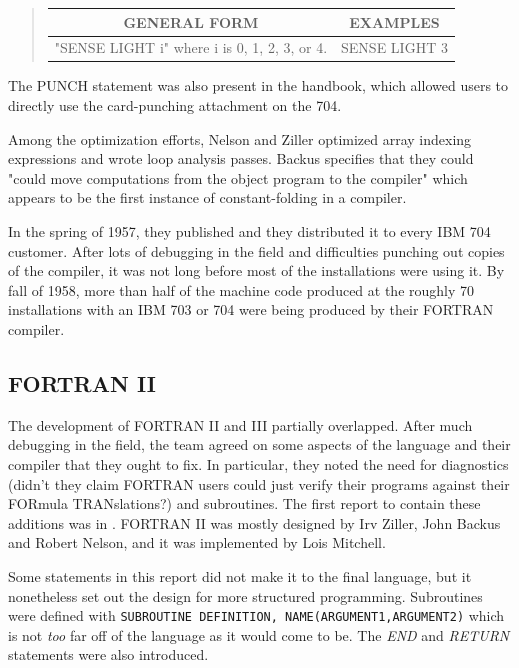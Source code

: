 \begin{quotation}
	\begin{tabular}{|c|c|}
		\hline
		GENERAL FORM                                 & EXAMPLES      \\
		\hline
		"SENSE LIGHT i" where i is 0, 1, 2, 3, or 4. & SENSE LIGHT 3 \\
		\hline
	\end{tabular}
\end{quotation}

The PUNCH statement was also present in the handbook, which allowed users to
directly use the card-punching attachment on the 704.

Among the optimization efforts, Nelson and Ziller optimized array indexing expressions and
wrote loop analysis passes.
Backus specifies that they could "could move computations from the object
program to the compiler" which appears to be the first instance of
\gls{constant-folding} in a compiler.

In the spring of 1957, they published 
and they distributed it to every IBM 704 customer.
After lots of debugging in the field and difficulties punching out copies
of the compiler, it was not long before most of the installations were using it.
By fall of 1958, more than half of the machine code produced at the roughly 70 installations
with an IBM 703 or 704 were being produced by their FORTRAN compiler.

\subsection{FORTRAN II}

The development of FORTRAN II and III partially overlapped.
After much debugging in the field, the team agreed on some aspects of the language
and their compiler that they ought to fix.
In particular, they noted the need for diagnostics (didn't they claim FORTRAN
users could just verify their programs against their FORmula TRANslations?)
and subroutines.
The first report to contain these additions was  in
\citeyear{fortran_ii_proposal_1957}.
FORTRAN II was mostly designed by Irv Ziller, John Backus and Robert Nelson,
and it was implemented by Lois Mitchell.

Some statements in this report did not make it to the final language, but it
nonetheless set out the design for more structured programming.
Subroutines were defined with \texttt{SUBROUTINE DEFINITION, NAME(ARGUMENT1,ARGUMENT2)}
which is not \textit{too} far off of the language as it would come to be.
The \textit{END} and \textit{RETURN} statements were also introduced.

